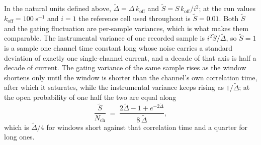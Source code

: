 In the natural units defined above, $\widetilde{\Delta} = \Delta\,k_{\mathrm{off}}$ and
$\widetilde{S} = S\,k_{\mathrm{off}}/i^2$; at the run values $k_{\mathrm{off}} =
100\;\mathrm{s}^{-1}$ and $i = 1$ the reference cell used throughout is $\widetilde{S} = 0.01$.
Both $\widetilde{S}$ and the gating fluctuation are per-sample variances, which is what makes them
comparable. The instrumental variance of one recorded sample is
$i^{2}\widetilde{S}/\widetilde{\Delta}$, so $\widetilde{S}=1$ is a sample one channel time constant
long whose noise carries a standard deviation of exactly one single-channel current, and a decade of
that axis is half a decade of current. The gating variance of the same sample rises as the window
shortens only until the window is shorter than the channel's own correlation time, after which it
saturates, while the instrumental variance keeps rising as $1/\widetilde{\Delta}$; at the open
probability of one half the two are equal along
\[
  \frac{\widetilde{S}}{N_{\mathrm{ch}}} \;=\;
  \frac{2\widetilde{\Delta}-1+e^{-2\widetilde{\Delta}}}{8\,\widetilde{\Delta}},
\]
which is $\widetilde{\Delta}/4$ for windows short against that correlation time and a quarter for
long ones.

